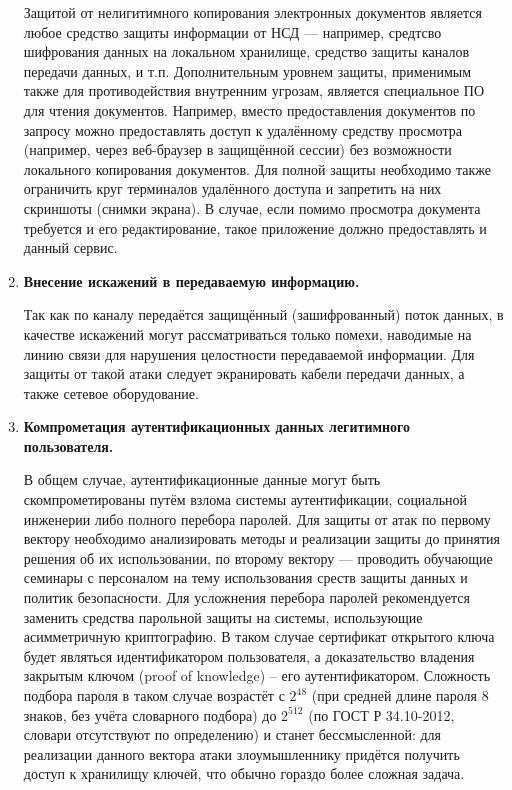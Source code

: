 \begin{enumerate}
	Защитой от нелигитимного копирования электронных документов является любое средство защиты информации от НСД --- например, средтсво шифрования данных на локальном хранилище, средство защиты каналов передачи данных, и т.п. Дополнительным уровнем защиты, применимым также для противодействия внутренним угрозам, является специальное ПО для чтения документов. Например, вместо предоставления документов по запросу можно предоставлять доступ к удалённому средству просмотра (например, через веб-браузер в защищённой сессии) без возможности локального копирования документов. Для полной защиты необходимо также ограничить круг терминалов удалённого доступа и запретить на них скриншоты (снимки экрана). В случае, если помимо просмотра документа требуется и его редактирование, такое приложение должно предоставлять и данный сервис.

	\item \textbf{Внесение искажений в передаваемую информацию.}

	Так как по каналу передаётся защищённый (зашифрованный) поток данных, в качестве искажений могут рассматриваться только помехи, наводимые на линию связи для нарушения целостности передаваемой информации. Для защиты от такой атаки следует экранировать кабели передачи данных, а также сетевое оборудование.

	\item \textbf{Компрометация аутентификационных данных легитимного пользователя.}

	В общем случае, аутентификационные данные могут быть скомпрометированы путём взлома системы аутентификации, социальной инженерии либо полного перебора паролей. Для защиты от атак по первому вектору необходимо анализировать методы и реализации защиты до принятия решения об их использовании, по второму вектору --- проводить обучающие семинары с персоналом на тему использования среств защиты данных и политик безопасности. Для усложнения перебора паролей рекомендуется заменить средства парольной защиты на системы, использующие асимметричную криптографию. В таком случае сертификат открытого ключа будет являться идентификатором пользователя, а доказательство владения закрытым ключом (proof of knowledge) -- его аутентификатором. Сложность подбора пароля в таком случае возрастёт с $2^{48}$ (при средней длине пароля 8 знаков, без учёта словарного подбора) до $2^{512}$ (по ГОСТ Р 34.10-2012, словари отсутствуют по определению) и станет бессмысленной: для реализации данного вектора атаки злоумышленнику придётся получить доступ к хранилищу ключей, что обычно гораздо более сложная задача.


\end{enumerate}
